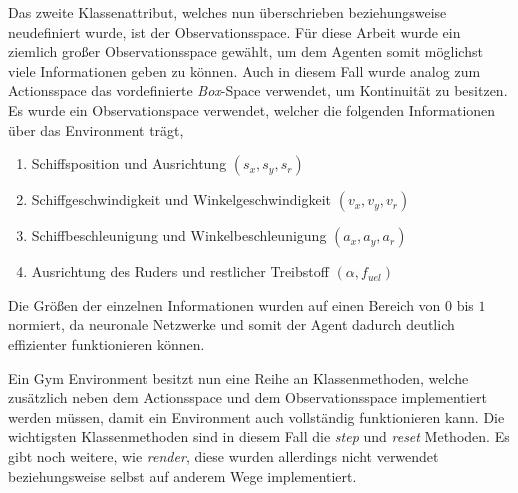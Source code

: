 \documentclass[]{iat}
\begin{document}
Das zweite Klassenattribut, welches nun überschrieben beziehungsweise neudefiniert wurde, ist der Observationsspace. Für diese Arbeit wurde ein ziemlich großer Observationsspace gewählt, um dem Agenten somit möglichst viele Informationen geben zu können. Auch in diesem Fall wurde analog zum Actionsspace das vordefinierte \textit{Box}-Space verwendet, um Kontinuität zu besitzen. Es wurde ein Observationspace verwendet, welcher die folgenden Informationen über das Environment trägt,
\begin{enumerate}
    \item Schiffsposition und Ausrichtung $(s_x, s_y, s_r)$
    \item Schiffgeschwindigkeit und Winkelgeschwindigkeit $(v_x, v_y, v_r)$
    \item Schiffbeschleunigung und Winkelbeschleunigung $(a_x, a_y, a_r)$
    \item Ausrichtung des Ruders und restlicher Treibstoff $(\alpha, f_{uel})$
\end{enumerate}
Die Größen der einzelnen Informationen wurden auf einen Bereich von $0$ bis $1$ normiert, da neuronale Netzwerke und somit der Agent dadurch deutlich effizienter funktionieren können. \cite[]{normalization_importance}

Ein Gym Environment besitzt nun eine Reihe an Klassenmethoden, welche zusätzlich neben dem Actionsspace und dem Observationsspace implementiert werden müssen, damit ein Environment auch vollständig funktionieren kann. Die wichtigsten Klassenmethoden sind in diesem Fall die \textit{step} und \textit{reset} Methoden. Es gibt noch weitere, wie \textit{render}, diese wurden allerdings nicht verwendet beziehungsweise selbst auf anderem Wege implementiert.
\end{document}
